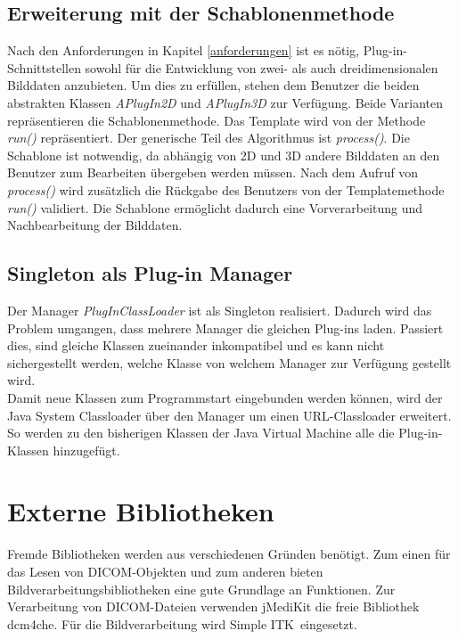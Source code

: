 \subsection{Erweiterung mit der Schablonenmethode}
Nach den Anforderungen in Kapitel \ref{anforderungen} ist es nötig, Plug-in-Schnittstellen sowohl für die Entwicklung von zwei- als auch dreidimensionalen Bilddaten anzubieten. Um dies zu erfüllen, stehen dem Benutzer die beiden abstrakten Klassen \textit{APlugIn2D} und \textit{APlugIn3D} zur Verfügung. Beide Varianten repräsentieren die Schablonenmethode. Das Template wird von der Methode \textit{run()} repräsentiert. Der generische Teil des Algorithmus ist \textit{process()}. Die Schablone ist notwendig, da abhängig von 2D und 3D andere Bilddaten an den Benutzer zum Bearbeiten übergeben werden müssen. Nach dem Aufruf von \textit{process()} wird zusätzlich die Rückgabe des Benutzers von der Templatemethode \textit{run()} validiert. Die Schablone ermöglicht dadurch eine Vorverarbeitung und Nachbearbeitung der Bilddaten.
 
\subsection{Singleton als Plug-in Manager}
Der Manager \textit{PlugInClassLoader} ist als Singleton realisiert. Dadurch wird das Problem umgangen, dass mehrere Manager die gleichen Plug-ins laden. Passiert dies, sind gleiche Klassen zueinander inkompatibel und es kann nicht sichergestellt werden, welche Klasse von welchem Manager zur Verfügung gestellt wird.\\
Damit neue Klassen zum Programmstart eingebunden werden können, wird der Java System Classloader über den Manager um einen URL-Classloader erweitert. So werden zu den bisherigen Klassen der Java Virtual Machine alle die Plug-in-Klassen hinzugefügt.

\section{Externe Bibliotheken}

Fremde Bibliotheken werden aus verschiedenen Gründen benötigt. Zum einen für das Lesen von DICOM-Objekten und zum anderen bieten Bildverarbeitungsbibliotheken eine gute Grundlage an Funktionen. Zur Verarbeitung von DICOM-Dateien verwenden jMediKit die freie Bibliothek \glqq dcm4che\grqq. Für die Bildverarbeitung wird \glqq Simple ITK\grqq\ eingesetzt.

